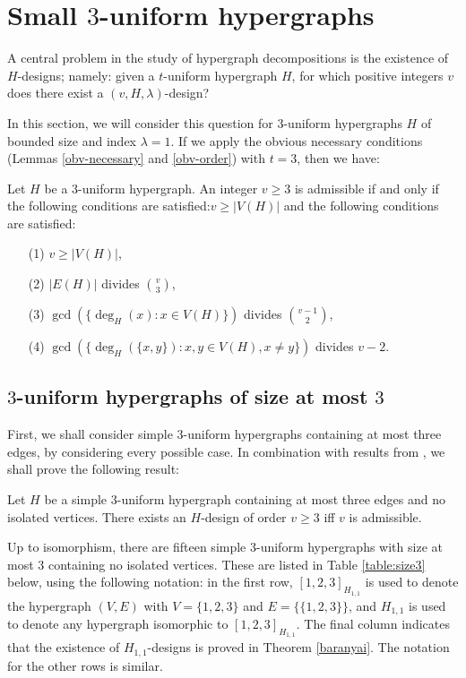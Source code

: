 \section{Small $3$-uniform hypergraphs} \label{section:small-h}

A central problem in the study of hypergraph decompositions is the existence of
$H$-designs; namely: given a $t$-uniform hypergraph $H$, for which positive
integers $v$ does there exist a $(v, H, \lambda)$-design?

In this section, we will consider this question for $3$-uniform hypergraphs $H$ of bounded size and index $\lambda = 1$.
If we apply the obvious necessary conditions (Lemmas \ref{obv-necessary} and \ref{obv-order}) with $t = 3$, then we have:

\begin{lemma} \label{necessary-3-uniform}
Let $H$ be a $3$-uniform hypergraph.
An integer $v \geq 3$ is admissible if and only if the following conditions are satisfied:$v \geq |V(H)|$ and the following conditions are satisfied:
\begin{enumerate}
    \item[(1)] $v \geq |V(H)|$,
    \item[(2)] $|E(H)|$ divides ${v \choose 3}$,
    \item[(3)] $\gcd(\{\deg_H(x) : x \in V(H)\})$ divides ${v-1 \choose 2}$,
    \item[(4)] $\gcd(\{\deg_H(\{x,y\}) : x, y \in V(H), x \neq y\})$ divides $v-2$.
\end{enumerate}
\end{lemma}

\subsection{$3$-uniform hypergraphs of size at most $3$}

First, we shall consider simple $3$-uniform hypergraphs containing at most three edges, by considering every possible case.
In combination with results from \cite{baran, bryant, feng-chang2, hanani}, we shall prove the following result:

\begin{theorem} \label{thm:size-le3}
Let $H$ be a simple $3$-uniform hypergraph containing at most three edges and no isolated vertices.
There exists an $H$-design of order $v \geq 3$ iff $v$ is admissible.
\end{theorem}

Up to isomorphism, there are fifteen simple $3$-uniform hypergraphs with size at most 3 containing no isolated vertices.
These are listed in Table \ref{table:size3} below, using the following notation: in the first row, $[1, 2, 3]_{H_{1,1}}$ is used to denote the hypergraph $(V, E)$ with $V = \{1, 2, 3\}$ and $E = \{\{1, 2, 3\}\}$, and $H_{1,1}$ is used to denote any hypergraph isomorphic to $[1, 2, 3]_{H_{1,1}}$.
The final column indicates that the existence of $H_{1,1}$-designs is proved in Theorem \ref{baranyai}.
The notation for the other rows is similar.

